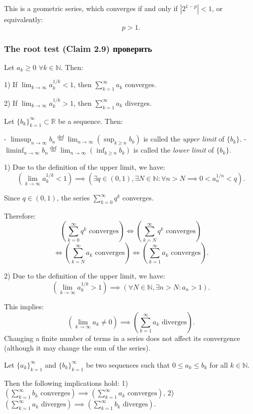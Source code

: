 This is a geometric series, which converges if and only if $|2^{1-p}| < 1$, or equivalently:
\[
p > 1.
\]


\subsubsection{The root test (Claim 2.9) проверить}
Let $a_k \geq 0$ $\forall k \in \mathbb{N}$. Then:

1) If $\lim_{k \to \infty} a_k^{1/k} < 1$, then $\sum_{k=1}^\infty a_k$ converges.

2) If $\lim_{k \to \infty} a_k^{1/k} > 1$, then $\sum_{k=1}^\infty a_k$ diverges.

Let $\{b_k\}_{k=1}^\infty \subset \mathbb{R}$ be a sequence. Then:

- $\limsup_{n \to \infty} b_n \overset{\text{def}}{=} \lim_{n \to \infty} (\sup_{k \geq n} b_k)$ is called the \emph{upper limit} of $\{b_k\}$.
- $\liminf_{n \to \infty} b_n \overset{\text{def}}{=} \lim_{n \to \infty} (\inf_{k \geq n} b_k)$ is called the \emph{lower limit} of $\{b_k\}$.

1) Due to the definition of the upper limit, we have:
\[
\left(\lim_{k \to \infty} a_k^{1/k} < 1\right) \implies \left(\exists q \in (0, 1), \exists N \in \mathbb{N}: \forall n > N \implies 0 < a_n^{1/n} < q\right).
\]

Since $q \in (0, 1)$, the series $\sum_{k=0}^\infty q^k$ converges.

Therefore:
\[
\left(\sum_{k=0}^\infty q^k \text{ converges}\right) \iff \left(\sum_{k=N}^\infty q^k \text{ converges}\right)
\]
\[
\iff \left(\sum_{k=N}^\infty a_k \text{ converges}\right) \iff \left(\sum_{k=1}^\infty a_k \text{ converges}\right).
\]

2) Due to the definition of the upper limit, we have:
\[
\left(\lim_{k \to \infty} a_k^{1/k} > 1\right) \implies \left(\forall N \in \mathbb{N}, \exists n > N: a_n > 1\right).
\]

This implies:
\[
\left(\lim_{k \to \infty} a_k \neq 0\right) \implies \left(\sum_{k=1}^\infty a_k \text{ diverges}\right).
\]
Changing a finite number of terms in a series does not affect its convergence (although it may change the sum of the series).

Let $\{a_k\}_{k=1}^\infty$ and $\{b_k\}_{k=1}^\infty$ be two sequences such that $0 \leq a_k \leq b_k$ for all $k \in \mathbb{N}$.

Then the following implications hold:
1) $\left( \sum_{k=1}^\infty b_k \text{ converges} \right) \implies \left( \sum_{k=1}^\infty a_k \text{ converges} \right)$,
2) $\left( \sum_{k=1}^\infty a_k \text{ diverges} \right) \implies \left( \sum_{k=1}^\infty b_k \text{ diverges} \right)$.

